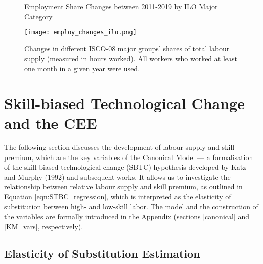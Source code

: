 \documentclass[11pt]{article}
\begin{document}
\begin{figure}[!htbp]%
\centering
    \caption{Employment Share Changes between 2011-2019 by ILO Major Category}
    {\texttt{[image: employ\_changes\_ilo.png]} }
    \caption*{\footnotesize Changes in different ISCO-08 major groups' shares of total labour supply (measured in hours worked). All workers who worked at least one month in a given year were used.}
\label{employ_changes_ilo}
\end{figure}



\newpage
\section{Skill-biased Technological Change and the CEE}\label{skill_bias_cee}

The following section discusses the development of labour supply and skill premium, which are the key variables of the Canonical Model — a formalisation of the skill-biased technological change (SBTC) hypothesis developed by Katz and Murphy (1992) and subsequent works. It allows us to investigate the relationship between relative labour supply and skill premium, as outlined in Equation \ref{eqn:STBC_regression}, which is interpreted as the elasticity of substitution between high- and low-skill labor. The model and the construction of the variables are formally introduced in the Appendix (sections \ref{canonical} and \ref{KM_vars}, respectively). 

\subsection{Elasticity of Substitution Estimation}
\end{document}
